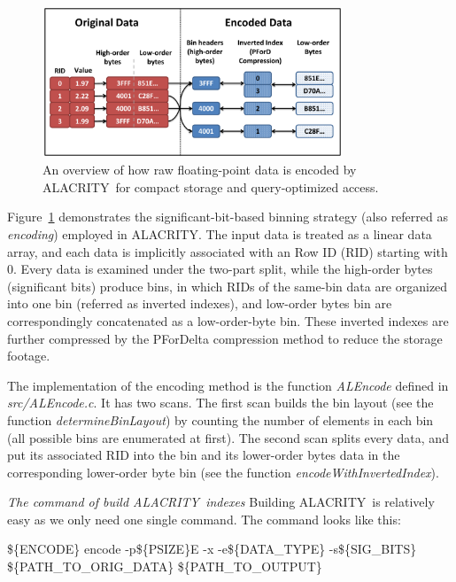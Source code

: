 \documentclass[11pt,a4paper]{article}
\newcommand{\alac}{ALACRITY}
\newcommand{\shell}[1]{\$\{{#1}\}}
\begin{document}
\begin{figure}[ht]             
\begin{center}                 
    \includegraphics[width=0.80\textwidth]{figures/alacrity-encoding-overview-color}
\end{center}
\caption{An overview of how raw floating-point data is encoded by \alac\ for
compact storage and query-optimized access.}
\label{fig:alac_method}  
\end{figure}

Figure~\ref{fig:alac_method} demonstrates the significant-bit-based binning strategy (also referred as \emph{encoding}) employed in \alac. 
The input data is treated as a linear data array, and each data is implicitly associated with an Row ID (RID) starting with 0. 
Every data is examined under the two-part split, while the high-order bytes (significant bits) produce bins, in which RIDs of the same-bin data are organized into one bin (referred as inverted indexes), and low-order bytes bin are correspondingly concatenated as a low-order-byte bin. 
These inverted indexes are further compressed by the PForDelta compression method to reduce the storage footage. 

The implementation of the encoding method is the function \emph{ALEncode} defined in \emph{src\//ALEncode.c}. It has two scans. The first scan builds the bin layout (see the function \emph{determineBinLayout}) by counting the number of elements in each bin (all possible bins are enumerated at first). The second scan splits every data, and put its associated RID into the bin and its lower-order bytes data in the corresponding lower-order byte bin (see the function \emph{encodeWithInvertedIndex}). 

\emph{The command of build \alac\ indexes} Building \alac\ is relatively easy as we only need one single command. The command looks like this:

  \shell{ENCODE} encode -p\shell{PSIZE}E  -x -e\shell{DATA\_TYPE}  -s\shell{SIG\_BITS}  \shell{PATH\_TO\_ORIG\_DATA} \shell{PATH\_TO\_OUTPUT} 
  
\end{document}

